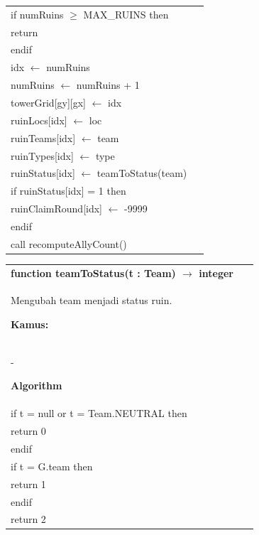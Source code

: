 \documentclass{article}
\newenvironment{pseudobox}
{
\centering
\begin{longtable}{|p{0.94\linewidth}|}
\hline
}
{
\\ \hline
\end{longtable}
\vspace{0.05cm}
}
\begin{document}
\begin{pseudobox}
\hspace*{1em} if numRuins $\geq$ MAX\_RUINS then \\
\hspace*{2em} return \\
\hspace*{1em} endif \\

\hspace*{1em} idx $\leftarrow$ numRuins \\
\hspace*{1em} numRuins $\leftarrow$ numRuins + 1 \\

\hspace*{1em} towerGrid[gy][gx] $\leftarrow$ idx \\
\hspace*{1em} ruinLocs[idx] $\leftarrow$ loc \\
\hspace*{1em} ruinTeams[idx] $\leftarrow$ team \\
\hspace*{1em} ruinTypes[idx] $\leftarrow$ type \\
\hspace*{1em} ruinStatus[idx] $\leftarrow$ teamToStatus(team) \\

\hspace*{1em} if ruinStatus[idx] = 1 then \\
\hspace*{2em} ruinClaimRound[idx] $\leftarrow$ -9999 \\
\hspace*{1em} endif \\

\hspace*{1em} call recomputeAllyCount()
\end{pseudobox}

\begin{pseudobox}
\textbf{function teamToStatus(t : Team) $\rightarrow$ integer} \\
{ Mengubah team menjadi status ruin. }

\textbf{Kamus:} \\
\hspace*{1em} -

\textbf{Algorithm} \\
\hspace*{1em} if t = null or t = Team.NEUTRAL then \\
\hspace*{2em} return 0 \\
\hspace*{1em} endif \\

\hspace*{1em} if t = G.team then \\
\hspace*{2em} return 1 \\
\hspace*{1em} endif \\

\hspace*{1em} return 2
\end{pseudobox}
\end{document}
